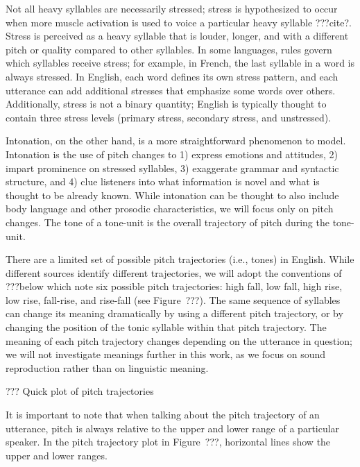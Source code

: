 
Not all heavy syllables are necessarily stressed;
stress is hypothesized to occur when
more muscle activation is used
to voice a particular heavy syllable
???cite?.
Stress is perceived as a heavy syllable
that is louder, longer, and with
a different pitch or quality compared
to other syllables.
In some languages, rules govern
which syllables receive stress;
for example, in French,
the last syllable in a word is
always stressed.
In English, each word defines
its own stress pattern,
and each utterance can add
additional stresses
that emphasize some words over others.
Additionally, stress is not a binary quantity;
English is typically thought to contain
three stress levels
(primary stress, secondary stress, and unstressed).

Intonation, on the other hand,
is a more straightforward phenomenon to model.
Intonation is the use of pitch changes
to 1) express emotions and attitudes,
2) impart prominence on stressed syllables,
3) exaggerate grammar and syntactic structure,
and 4) clue listeners into what information
is novel and what is thought to be already known.
While intonation can be thought to also include
body language and other prosodic characteristics,
we will focus only on pitch changes.
The tone of a tone-unit
is the overall trajectory of pitch
during the tone-unit.

There are a limited set of possible pitch trajectories
(i.e., tones) in English.
While different sources identify different trajectories,
we will adopt the conventions of ???below
which note six possible pitch trajectories:
high fall, low fall, high rise,
low rise, fall-rise, and rise-fall
(see Figure~???).
The same sequence of syllables
can change its meaning dramatically
by using a different pitch trajectory,
or by changing the position of the
tonic syllable within that pitch trajectory.
The meaning of each pitch trajectory
changes depending on the utterance in question;
we will not investigate meanings further
in this work, as we focus on
sound reproduction rather than on
linguistic meaning.

??? Quick plot of pitch trajectories


It is important to note that when talking about
the pitch trajectory of an utterance,
pitch is always relative to the
upper and lower range of a particular speaker.
In the pitch trajectory plot in Figure~???,
horizontal lines show the upper and lower ranges.

